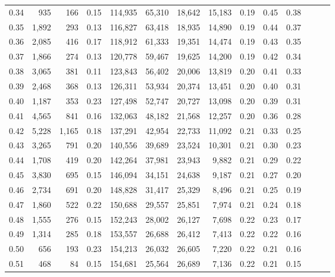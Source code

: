 \begin{tabular}{rrrrrrrrrrrrrr}
0.34 &     935 &    166 &  0.15 &  114,935 &   65,310 &  18,642 &  15,183 &  0.19 &  0.45 &      0.38 \\
0.35 &   1,892 &    293 &  0.13 &  116,827 &   63,418 &  18,935 &  14,890 &  0.19 &  0.44 &      0.37 \\
0.36 &   2,085 &    416 &  0.17 &  118,912 &   61,333 &  19,351 &  14,474 &  0.19 &  0.43 &      0.35 \\
0.37 &   1,866 &    274 &  0.13 &  120,778 &   59,467 &  19,625 &  14,200 &  0.19 &  0.42 &      0.34 \\
0.38 &   3,065 &    381 &  0.11 &  123,843 &   56,402 &  20,006 &  13,819 &  0.20 &  0.41 &      0.33 \\
0.39 &   2,468 &    368 &  0.13 &  126,311 &   53,934 &  20,374 &  13,451 &  0.20 &  0.40 &      0.31 \\
0.40 &   1,187 &    353 &  0.23 &  127,498 &   52,747 &  20,727 &  13,098 &  0.20 &  0.39 &      0.31 \\
0.41 &   4,565 &    841 &  0.16 &  132,063 &   48,182 &  21,568 &  12,257 &  0.20 &  0.36 &      0.28 \\
0.42 &   5,228 &  1,165 &  0.18 &  137,291 &   42,954 &  22,733 &  11,092 &  0.21 &  0.33 &      0.25 \\
0.43 &   3,265 &    791 &  0.20 &  140,556 &   39,689 &  23,524 &  10,301 &  0.21 &  0.30 &      0.23 \\
0.44 &   1,708 &    419 &  0.20 &  142,264 &   37,981 &  23,943 &   9,882 &  0.21 &  0.29 &      0.22 \\
0.45 &   3,830 &    695 &  0.15 &  146,094 &   34,151 &  24,638 &   9,187 &  0.21 &  0.27 &      0.20 \\
0.46 &   2,734 &    691 &  0.20 &  148,828 &   31,417 &  25,329 &   8,496 &  0.21 &  0.25 &      0.19 \\
0.47 &   1,860 &    522 &  0.22 &  150,688 &   29,557 &  25,851 &   7,974 &  0.21 &  0.24 &      0.18 \\
0.48 &   1,555 &    276 &  0.15 &  152,243 &   28,002 &  26,127 &   7,698 &  0.22 &  0.23 &      0.17 \\
0.49 &   1,314 &    285 &  0.18 &  153,557 &   26,688 &  26,412 &   7,413 &  0.22 &  0.22 &      0.16 \\
0.50 &     656 &    193 &  0.23 &  154,213 &   26,032 &  26,605 &   7,220 &  0.22 &  0.21 &      0.16 \\
0.51 &     468 &     84 &  0.15 &  154,681 &   25,564 &  26,689 &   7,136 &  0.22 &  0.21 &      0.15 \\

\end{tabular}

